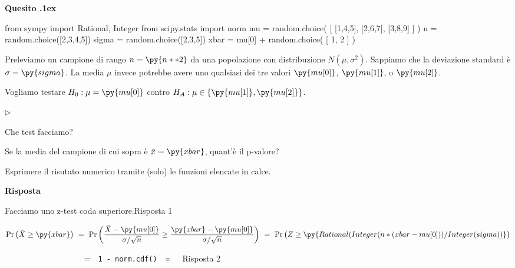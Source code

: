 \documentclass[11pt,twoside,a4paper]{article}
\newcommand{\mylabel}[1]{#1\hfill}
\renewenvironment{itemize}
  {\begin{list}{$\triangleright$}{%
   \setlength{\parskip}{0mm}
   \setlength{\topsep}{.4\baselineskip}
   \setlength{\rightmargin}{0mm}
   \setlength{\listparindent}{0mm}
   \setlength{\itemindent}{0mm}
   \setlength{\labelwidth}{2ex}
   \setlength{\itemsep}{.4\baselineskip}
   \setlength{\parsep}{0mm}
   \setlength{\partopsep}{0mm}
   \setlength{\labelsep}{1ex}
   \setlength{\leftmargin}{\labelwidth+\labelsep}
   \let\makelabel\mylabel}}{%
   \end{list}\vspace*{-1.3mm}}
\def\Pr{{\rm Pr\,}}
\newcounter{quesito}
\newenvironment{question}{\bigskip\addtocounter{quesito}{1}\par\textbf{Quesito \thequesito.\kern1ex}}{\vspace{\parskip}}
\newenvironment{answer}{\par\textbf{Risposta\quad}}{\vspace{\parskip}}
\begin{document}
\clearpage
\begin{question} %
\begin{pycode}
from sympy import Rational, Integer
from scipy.stats import norm
mu = random.choice( [ [1,4,5], [2,6,7], [3,8,9] ] ) 
n = random.choice([2,3,4,5])
sigma = random.choice([2,3,5])
xbar = mu[0] + random.choice( [ 1, 2 ] ) 
\end{pycode}
Preleviamo un campione di rango $n=\py{n**2}$ da una popolazione con distribuzione $N(\mu,\sigma^2)$. Sappiamo che la deviazione standard è $\sigma=\py{sigma}$. La media $\mu$ invece potrebbe avere uno qualsiasi dei tre valori $\py{mu[0]}$, $\py{mu[1]}$, o $\py{mu[2]}$. 

Vogliamo testare $H_0:\mu=\py{mu[0]}$ contro $H_A:\mu\in\{\py{mu[1]},\py{mu[2]}\}$.
\begin{itemize}
\item[1.] Che test facciamo?
\item[2.] Se la media del campione di cui sopra è $\bar x=\py{xbar}$, quant'è il p-valore?
\end{itemize}

Esprimere il risutato numerico tramite (solo) le funzioni elencate in calce.
\begin{answer}

{\color{blue}Facciamo uno z-test coda superiore.\hfill Risposta 1}

$\Pr\big(\bar X\ge\py{xbar}\big)\ =\ \Pr\bigg(\dfrac{\bar X-\py{mu[0]}}{\sigma/\sqrt{n}}\ge\dfrac{\py{xbar}-\py{mu[0]} }{\sigma/\sqrt{n} }\bigg)\ =\ \Pr\big(Z\ge\py{Rational(Integer(n*(xbar-mu[0]) ) / Integer(sigma) ) }\big)$

$\phantom{\Pr\big(\bar X\ge\py{xbar}\big)}\ =\ ${\color{blue}\tt\ 1 - norm.cdf() }{\tt\ =  \  }{\color{blue}\hfill Risposta 2}



\end{answer}
\end{question}
\end{document}
